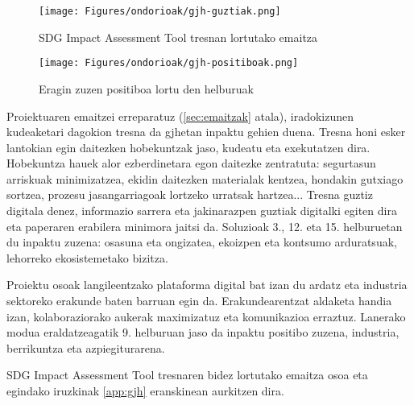 \begin{figure}[H]
\centering
\texttt{[image: Figures/ondorioak/gjh-guztiak.png]}
\caption{SDG Impact Assessment Tool tresnan lortutako emaitza}
\label{gjh-guztiak}
\end{figure}

\begin{figure}[H]
\centering
\texttt{[image: Figures/ondorioak/gjh-positiboak.png]}
\caption{Eragin zuzen positiboa lortu den helburuak}
\label{gjh-positiboak}
\end{figure}

Proiektuaren emaitzei erreparatuz (\ref{sec:emaitzak} atala), iradokizunen kudeaketari dagokion tresna da \acrshort{gjh}etan inpaktu gehien duena. Tresna honi esker lantokian egin daitezken hobekuntzak jaso, kudeatu eta exekutatzen dira. Hobekuntza hauek alor ezberdinetara egon daitezke zentratuta: segurtasun arriskuak minimizatzea, ekidin daitezken materialak kentzea, hondakin gutxiago sortzea, prozesu jasangarriagoak lortzeko urratsak hartzea... Tresna guztiz digitala denez, informazio sarrera eta jakinarazpen guztiak digitalki egiten dira eta paperaren erabilera minimora jaitsi da. Soluzioak 3., 12. eta 15. helburuetan du inpaktu zuzena: osasuna eta ongizatea, ekoizpen eta kontsumo arduratsuak, lehorreko ekosistemetako bizitza. 

Proiektu osoak langileentzako plataforma digital bat izan du ardatz eta industria sektoreko erakunde baten barruan egin da. Erakundearentzat aldaketa handia izan, kolaboraziorako aukerak maximizatuz eta komunikazioa erraztuz. Lanerako modua eraldatzeagatik 9. helburuan jaso da inpaktu positibo zuzena, industria, berrikuntza eta azpiegiturarena. 



SDG Impact Assessment Tool tresnaren bidez lortutako emaitza osoa eta egindako iruzkinak \ref{app:gjh} eranskinean aurkitzen dira. 

\fi